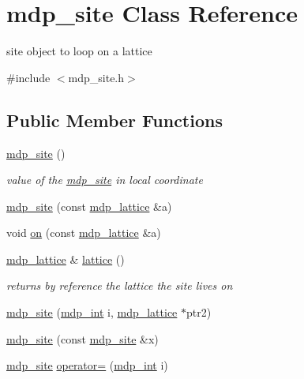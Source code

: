 \hypertarget{classmdp__site}{}\section{mdp\+\_\+site Class Reference}
\label{classmdp__site}


site object to loop on a lattice  




{\ttfamily \#include $<$mdp\+\_\+site.\+h$>$}

\subsection*{Public Member Functions}
\begin{DoxyCompactItemize}
\item 
\hyperlink{classmdp__site_a9c6937993f8faf46420b724f03f3649d}{mdp\+\_\+site} ()
\begin{DoxyCompactList}\small\item\em value of the \hyperlink{classmdp__site}{mdp\+\_\+site} in local coordinate \end{DoxyCompactList}\item 
\hyperlink{classmdp__site_ab61e8e96573d58449ee28b9505ca799b}{mdp\+\_\+site} (const \hyperlink{classmdp__lattice}{mdp\+\_\+lattice} \&a)
\item 
void \hyperlink{classmdp__site_a6342ca7fb3edaef8b09854ca98399fa4}{on} (const \hyperlink{classmdp__lattice}{mdp\+\_\+lattice} \&a)
\item 
\hyperlink{classmdp__lattice}{mdp\+\_\+lattice} \& \hyperlink{classmdp__site_aae3a1de2fd7fafccbd1d6bd971c908c4}{lattice} ()
\begin{DoxyCompactList}\small\item\em returns by reference the lattice the site lives on \end{DoxyCompactList}\item 
\hyperlink{classmdp__site_a6bde992431323419da31c2ce584d7821}{mdp\+\_\+site} (\hyperlink{mdp__global__vars_8h_aaa1ad9d0dcd2124aa5af0120d9954174}{mdp\+\_\+int} i, \hyperlink{classmdp__lattice}{mdp\+\_\+lattice} $\ast$ptr2)
\item 
\hyperlink{classmdp__site_aa16c96d8e1013d1581df1ae3a980d272}{mdp\+\_\+site} (const \hyperlink{classmdp__site}{mdp\+\_\+site} \&x)
\item 
\hyperlink{classmdp__site}{mdp\+\_\+site} \hyperlink{classmdp__site_ab54108d3429bf4edb3d2434545a425c2}{operator=} (\hyperlink{mdp__global__vars_8h_aaa1ad9d0dcd2124aa5af0120d9954174}{mdp\+\_\+int} i)

\end{DoxyCompactItemize}
